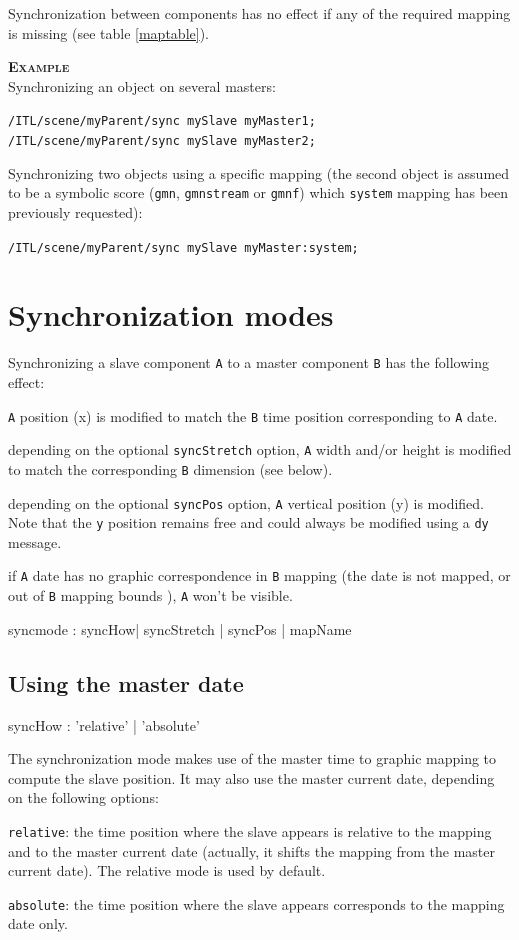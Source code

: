 \documentclass[a4paper,twoside]{report}
\newcommand{\sublevel}[1]	{\section{#1}}
\newcommand{\subsublevel}[1]	{\subsection{#1}}
\newcommand{\OSC}[1]		{\texttt{#1}}
\newcommand{\values}[1]		{\texttt{#1}}
\newcommand{\example}		{\textbf{\hspace{-1.5cm}\textbf{\textsc{Example }}}}
\let\olditemize\itemize
\let\oldenditemize\enditemize
\renewenvironment{itemize} 	{\olditemize \setlength{\itemsep}{1mm}}{\oldenditemize}
\newcommand{\sample}	[1]			{\vspace{-2mm}\begin{center}\colorbox{mygrey}{
								\begin{minipage}[t]{0.9\columnwidth} 
								{\small \texttt{#1}}
								\end{minipage}}\end{center}}
\begin{document}
Synchronization between components has no effect if any of the required mapping is missing (see table \ref{maptable}).

\example \\
Synchronizing an object on several masters:
\sample{/ITL/scene/myParent/sync mySlave myMaster1;\\
/ITL/scene/myParent/sync mySlave myMaster2;}

Synchronizing two objects using a specific mapping (the second object is assumed to be a symbolic score (\OSC{gmn}, \OSC{gmnstream} or \OSC{gmnf}) which \OSC{system} mapping has been previously requested):
\sample{/ITL/scene/myParent/sync mySlave myMaster:system;}

\sublevel{Synchronization modes}\label{syncmode}

Synchronizing a slave component \values{A} to a master component \values{B} has the following effect:
\begin{itemize}
\item \values{A} position (x) is modified to match the \values{B} time position corresponding to \values{A} date.
\item depending on the optional \OSC{syncStretch} option, \values{A} width and/or height is modified to match the  corresponding \values{B} dimension (see below).
\item depending on the optional \OSC{syncPos} option, \values{A} vertical position (y) is modified. Note that the \OSC{y} position remains free and could always be modified using a \OSC{dy} message.
\item if \values{A} date has no graphic correspondence in \values{B} mapping (the date is not mapped, or out of \values{B} mapping bounds ), \values{A} won't be visible.
\end{itemize}

\begin{rail}
syncmode : syncHow| syncStretch | syncPos | mapName
\end{rail}

\subsublevel{Using the master date}
\begin{rail}
syncHow : 'relative' | 'absolute'
\end{rail}

The synchronization mode makes use of the master time to graphic mapping to compute the slave position. It may also use the master current date, depending on the following options:
\begin{itemize}
\item \OSC{relative}: the time position where the slave appears is relative to the mapping and to the master current date (actually, it shifts the mapping from the master current date). The relative mode is used by default.
\item \OSC{absolute}: the time position where the slave appears corresponds to the mapping date only.
\end{itemize}
\end{document}

